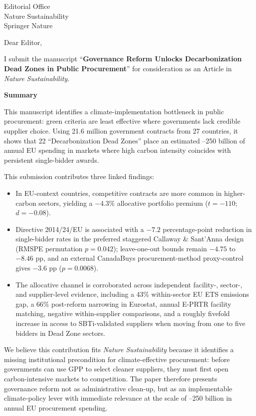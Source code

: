 \documentclass[11pt]{letter}
\begin{document}
\begin{letter}{Editorial Office\\Nature Sustainability\\Springer Nature}

\opening{Dear Editor,}

I submit the manuscript ``\textbf{Governance Reform Unlocks Decarbonization Dead Zones in Public Procurement}'' for consideration as an Article in \textit{Nature Sustainability}.

\textbf{Summary}

This manuscript identifies a climate-implementation bottleneck in public procurement: green criteria are least effective where governments lack credible supplier choice. Using 21.6 million government contracts from 27 countries, it shows that 22 ``Decarbonization Dead Zones'' place an estimated --250 billion of annual EU spending in markets where high carbon intensity coincides with persistent single-bidder awards.

This submission contributes three linked findings:
\begin{itemize}[leftmargin=1.4em,itemsep=2pt,topsep=2pt]
    \item In EU-context countries, competitive contracts are more common in higher-carbon sectors, yielding a $-4.3\%$ allocative portfolio premium ($t=-110$; $d=-0.08$).
    \item Directive 2014/24/EU is associated with a $-7.2$ percentage-point reduction in single-bidder rates in the preferred staggered Callaway \& Sant'Anna design (RMSPE permutation $p=0.042$); leave-one-out bounds remain $-4.75$ to $-8.46$ pp, and an external CanadaBuys procurement-method proxy-control gives $-3.6$ pp ($p=0.0068$).
    \item The allocative channel is corroborated across independent facility-, sector-, and supplier-level evidence, including a 43\% within-sector EU ETS emissions gap, a 66\% post-reform narrowing in Eurostat, annual E-PRTR facility matching, negative within-supplier comparisons, and a roughly fivefold increase in access to SBTi-validated suppliers when moving from one to five bidders in Dead Zone sectors.
\end{itemize}

We believe this contribution fits \textit{Nature Sustainability} because it identifies a missing institutional precondition for climate-effective procurement: before governments can use GPP to select cleaner suppliers, they must first open carbon-intensive markets to competition. The paper therefore presents governance reform not as administrative clean-up, but as an implementable climate-policy lever with immediate relevance at the scale of --250 billion in annual EU procurement spending.


\end{letter}
\end{document}
